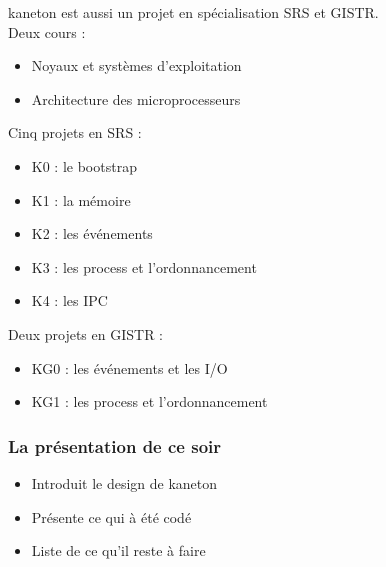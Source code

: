 \begin{frame}

  kaneton est aussi un projet en sp\'{e}cialisation SRS et GISTR.\\

  Deux cours :

  \-

  \begin{itemize}
  \item
    Noyaux et syst\`{e}mes d'exploitation
  \item
    Architecture des microprocesseurs
  \end{itemize}

  \-

  Cinq projets en SRS :

  \-

  \begin{itemize}
  \item
    K0 : le bootstrap
  \item
    K1 : la m\'{e}moire
  \item
    K2 : les \'{e}v\'{e}nements
  \item
    K3 : les process et l'ordonnancement
  \item
    K4 : les IPC
  \end{itemize}

  \-

  Deux projets en GISTR :

  \-

  \begin{itemize}
  \item
    KG0 : les \'{e}v\'{e}nements et les I/O
  \item
    KG1 : les process et l'ordonnancement
  \end{itemize}
\end{frame}


\begin{frame}
  \frametitle{La pr\'{e}sentation de ce soir}

  \begin{itemize}
  \item
    Introduit le design de kaneton
  \item
    Pr\'{e}sente ce qui \`{a} \'{e}t\'{e} cod\'{e}
  \item
    Liste de ce qu'il reste \`{a} faire
  \end{itemize}
\end{frame}

%
%

